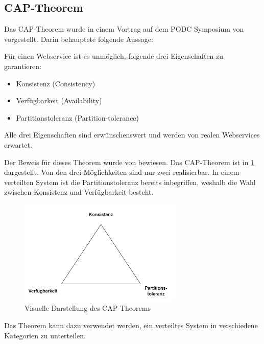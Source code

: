 \subsection{CAP-Theorem} \label{subsec:cap-theorem}
Das CAP-Theorem wurde \citeyear{Brewer.} in einem Vortrag auf dem PODC Symposium von \citeauthor{Brewer.} vorgestellt. Darin behauptete \citeauthor{Brewer.} folgende Aussage:

\begin{theorem} 
Für einen Webservice ist es unmöglich, folgende drei Eigenschaften zu garantieren:
\begin{itemize}
	\item Konsistenz (Consistency)
	\item Verfügbarkeit (Availability)
	\item Partitionstoleranz (Partition-tolerance)
\end{itemize}
Alle drei Eigenschaften sind erwünschenswert und werden von realen Webservices erwartet\cite{Brewer.}.
\end{theorem}

Der Beweis für dieses Theorem wurde \citeyear{Gilbert.2002} von \citeauthor{Gilbert.2002} bewiesen. Das CAP-Theorem ist in \cref{fig:cap_theorem} dargestellt. Von den drei Möglichkeiten sind nur zwei realisierbar. In einem verteilten System ist die Partitionstoleranz bereits inbegriffen, weshalb die Wahl zwischen Konsistenz und Verfügbarkeit besteht. 

\begin{figure}[!htbp]
	\centering
	\includegraphics[height=5cm]{figures/ChapterGrundlagen/cap_theorem.png}
	\caption{Visuelle Darstellung des CAP-Theorems}
	\label{fig:cap_theorem}
\end{figure}
\FloatBarrier

Das Theorem kann dazu verwendet werden, ein verteiltes System in verschiedene Kategorien zu unterteilen. 

